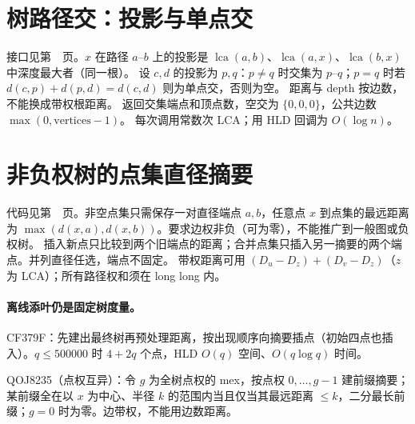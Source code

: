 \section{树路径交：投影与单点交}\label{knowledge-path-intersection}
接口见第~\pageref{compact-path_intersection}~页。$x$ 在路径 $a$--$b$ 上的投影是
$\operatorname{lca}(a,b)$、$\operatorname{lca}(a,x)$、$\operatorname{lca}(b,x)$ 中深度最大者（同一根）。
设 $c,d$ 的投影为 $p,q$：$p\ne q$ 时交集为 $p$--$q$；$p=q$ 时若 $d(c,p)+d(p,d)=d(c,d)$ 则为单点交，否则为空。
距离与 depth 按边数，不能换成带权根距离。
返回交集端点和顶点数，空交为 $\{0,0,0\}$，公共边数 $\max(0,\mathrm{vertices}-1)$。
每次调用常数次 LCA；用 HLD 回调为 $O(\log n)$。

\section{非负权树的点集直径摘要}\label{knowledge-set-diameter}
代码见第~\pageref{compact-TreeDiameter}~页。非空点集只需保存一对直径端点 $a,b$，任意点 $x$ 到点集的最远距离为
$\max(d(x,a),d(x,b))$。要求边权非负（可为零），不能推广到一般图或负权树。
插入新点只比较到两个旧端点的距离；合并点集只插入另一摘要的两个端点。并列直径任选，端点不固定。
带权距离可用 $(D_u-D_z)+(D_v-D_z)$（$z$ 为 LCA）；所有路径权和须在 long long 内。

\paragraph{离线添叶仍是固定树度量。}
CF379F：先建出最终树再预处理距离，按出现顺序向摘要插点（初始四点也插入）。$q\le500000$ 时 $4+2q$ 个点，HLD $O(q)$ 空间、$O(q\log q)$ 时间。

QOJ8235（点权互异）：令 $g$ 为全树点权的 mex，按点权 $0,\ldots,g-1$ 建前缀摘要；
某前缀全在以 $x$ 为中心、半径 $k$ 的范围内当且仅当其最远距离 $\le k$，二分最长前缀；$g=0$ 时为零。边带权，不能用边数距离。

\clearpage
